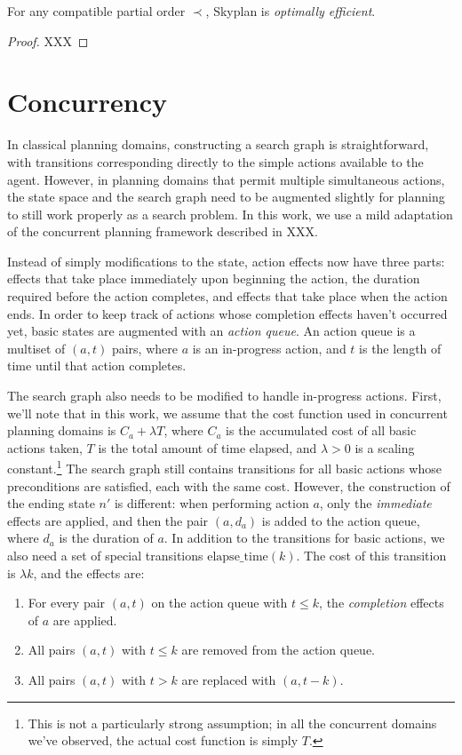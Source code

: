 \documentclass[letterpaper]{article}
\theoremstyle{plain} \newtheorem{theorem}{Theorem} \newtheorem{proposition}{Proposition} \newtheorem{lemma}{Lemma}
\theoremstyle{definition} \newtheorem{definition}{Definition} \newtheorem{conjecture}{Conjecture} \newtheorem*{example}{Example}
\theoremstyle{remark} \newtheorem*{remark}{Remark} \newtheorem*{note}{Note} \newtheorem{case}{Case}
\begin{document}
\begin{claim}{}\label{clm-optimally-efficient}
For any compatible partial order $\prec$, Skyplan is \emph{optimally efficient}.
\end{claim}
\begin{proof} XXX \end{proof}
	

\section{Concurrency}

In classical planning domains, constructing a search graph is straightforward, with
transitions corresponding directly to the simple actions available to the agent. However,
in planning domains that permit multiple simultaneous actions, the state space and the
search graph need to be augmented slightly for planning to still work properly as a search
problem. In this work, we use a mild adaptation of the concurrent planning framework described in XXX.

Instead of simply modifications to the state, action effects now have three parts: effects
that take place immediately upon beginning the action, the duration required before the
action completes, and effects that take place when the action ends. In order to keep track
of actions whose completion effects haven't occurred yet, basic states are augmented with
an \emph{action queue}. An action queue is a multiset of $(a, t)$ pairs, where $a$ is an
in-progress action, and $t$ is the length of time until that action completes.

The search graph also needs to be modified to handle in-progress actions. First, we'll note
that in this work, we assume that the cost function used in concurrent planning domains is
$C_a + \lambda T$, where $C_a$ is the accumulated cost of all basic actions taken, $T$ is
the total amount of time elapsed, and $\lambda > 0$ is a scaling constant.\footnote{This is
not a particularly strong assumption; in all the concurrent domains we've observed, the
actual cost function is simply $T$.} The search graph still contains transitions for all
basic actions whose preconditions are satisfied, each with the same cost. However, the
construction of the ending state $n'$ is different: when performing action $a$, only the
\emph{immediate} effects are applied, and then the pair $(a, d_a)$ is added to the action
queue, where $d_a$ is the duration of $a$. In addition to the transitions for basic actions, we also need a set of special transitions $\mathrm{elapse\_time}(k)$. The cost of this transition is $\lambda k$, and the effects are: 
\begin{enumerate}
	\item For every pair $(a, t)$ on the action queue with $t \le k$, the \emph{completion} effects of $a$ are applied.
	\item All pairs $(a, t)$ with $t \le k$ are removed from the action queue.
	\item All pairs $(a, t)$ with $t > k$ are replaced with $(a, t-k)$.
\end{enumerate}
\end{document}
